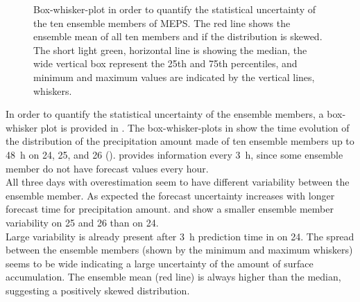 \begin{figure}[h!]
\begin{subfigure}[b]{\textwidth}
		\caption{}\label{fig:boxplot:26}
	\end{subfigure}
	\caption{Box-whisker-plot in order to quantify the statistical uncertainty of the ten ensemble members of MEPS. The red line shows the ensemble mean of all ten members and if the distribution is skewed. The short light green, horizontal line is showing the median, the wide vertical box represent the 25th and 75th percentiles, and minimum and maximum values are indicated by the vertical lines, whiskers.}\label{fig:boxplot}
\end{figure}
\noindent
In order to quantify the statistical uncertainty of the ensemble members, a box-whisker plot is provided in . The box-whisker-plots in  show the time evolution of the distribution of the precipitation amount made of ten ensemble members up to \SI{48}{\hour} on \num{24}, \num{25}, and \SI{26}{\dec} (). 
 provides information every \SI{3}{\hour}, since some ensemble member do not have forecast values every hour.
\\
All three days with overestimation seem to have different variability between the ensemble member. As expected the forecast uncertainty increases  with longer forecast time for precipitation amount.  and  show a smaller ensemble member variability on \num{25} and \SI{26}{\dec} than on \SI{24}{\dec}.
\\
Large variability is already present after \SI{3}{\hour} prediction time in  on \SI{24}{\dec}. The spread between the ensemble members (shown by the minimum and maximum whiskers) seems to be wide indicating a large uncertainty of the amount of surface accumulation. The ensemble mean (red line) is always higher than the median, suggesting a positively skewed distribution. 

